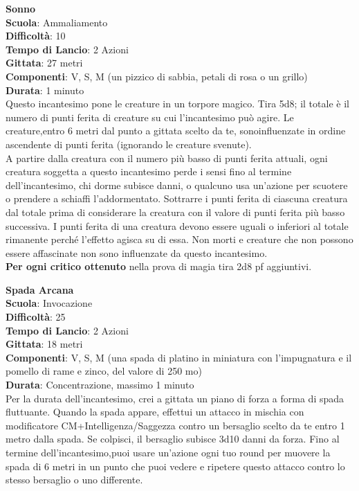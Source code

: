 \begin{multicols}{2}
\medskip\textbf{Sonno}\\
\textbf{Scuola}: Ammaliamento\\
\textbf{Difficoltà}:  10\\
\textbf{Tempo di Lancio}: 2 Azioni\\
\textbf{Gittata}: 27 metri\\
\textbf{Componenti}: V, S, M (un pizzico di sabbia, petali di rosa o un grillo)\\
\textbf{Durata}: 1 minuto\\
Questo incantesimo pone le creature in un torpore magico. Tira 5d8; il totale è il numero di punti ferita di creature su cui l'incantesimo può agire. Le creature,entro 6 metri dal punto a gittata  scelto da te, sonoinfluenzate in ordine ascendente di punti ferita  (ignorando le creature svenute).\\
A partire dalla creatura con il numero più basso di punti ferita attuali, ogni creatura soggetta a questo incantesimo perde i sensi fino al termine dell'incantesimo, chi dorme subisce danni, o  qualcuno usa un'azione per scuotere o prendere a schiaffi l’addormentato. Sottrarre i punti ferita di ciascuna creatura dal totale prima di considerare la creatura con il valore di punti ferita più basso successiva. I punti ferita di una creatura devono essere uguali o inferiori al totale rimanente perché l’effetto agisca su di essa. Non morti e creature che non possono essere affascinate non sono influenzate da questo incantesimo.\\
\textbf{Per ogni critico ottenuto} nella prova di magia tira 2d8 pf aggiuntivi.

\medskip\textbf{Spada Arcana}\\
\textbf{Scuola}: Invocazione\\
\textbf{Difficoltà}:  25\\
\textbf{Tempo di Lancio}: 2 Azioni\\
\textbf{Gittata}: 18 metri\\
\textbf{Componenti}: V, S, M (una spada di platino in miniatura con l’impugnatura e il pomello di rame e zinco, del valore di 250 mo)\\
\textbf{Durata}: Concentrazione, massimo 1 minuto \\
Per la durata dell'incantesimo, crei a gittata un piano di forza a forma di spada fluttuante. Quando la spada appare, effettui un attacco in mischia con modificatore CM+Intelligenza/Saggezza  contro un bersaglio scelto da  te entro 1 metro dalla spada. Se colpisci, il bersaglio subisce 3d10 danni da forza. Fino  al termine dell'incantesimo,puoi usare un'azione ogni tuo round per muovere  la spada di 6 metri in un punto che puoi vedere e ripetere questo attacco contro lo stesso bersaglio o uno differente.


\end{multicols}
